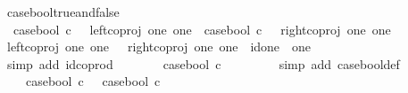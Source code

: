 \begin{isabellebody}
\endisatagproof
{\isafoldproof}%
%
\isadelimproof
\isanewline
%
\endisadelimproof
\isanewline
{}\isamarkupfalse%
\ case{\isacharunderscore}{\kern0pt}bool{\isacharunderscore}{\kern0pt}true{\isacharunderscore}{\kern0pt}and{\isacharunderscore}{\kern0pt}false{\isacharcolon}{\kern0pt}\isanewline
\ \ {\isachardoublequoteopen}{\isacharparenleft}{\kern0pt}case{\isacharunderscore}{\kern0pt}bool\ {\isasymcirc}\isactrlsub c\ {\isasymt}\ {\isacharequal}{\kern0pt}\ left{\isacharunderscore}{\kern0pt}coproj\ one\ one{\isacharparenright}{\kern0pt}\ {\isasymand}\ {\isacharparenleft}{\kern0pt}case{\isacharunderscore}{\kern0pt}bool\ {\isasymcirc}\isactrlsub c\ {\isasymf}\ {\isacharequal}{\kern0pt}\ right{\isacharunderscore}{\kern0pt}coproj\ one\ one{\isacharparenright}{\kern0pt}{\isachardoublequoteclose}\isanewline
%
\isadelimproof
%
\endisadelimproof
%
\isatagproof
{}\isamarkupfalse%
\ {\isacharminus}{\kern0pt}\isanewline
\ \ \isamarkupfalse%
\ {\isachardoublequoteopen}{\isacharparenleft}{\kern0pt}left{\isacharunderscore}{\kern0pt}coproj\ one\ one{\isacharparenright}{\kern0pt}\ {\isasymamalg}\ \ {\isacharparenleft}{\kern0pt}right{\isacharunderscore}{\kern0pt}coproj\ one\ one{\isacharparenright}{\kern0pt}\ {\isacharequal}{\kern0pt}\ id{\isacharparenleft}{\kern0pt}one\ {\isasymCoprod}\ one{\isacharparenright}{\kern0pt}{\isachardoublequoteclose}\isanewline
\ \ \ \ \isamarkupfalse%
\ {\isacharparenleft}{\kern0pt}simp\ add{\isacharcolon}{\kern0pt}\ id{\isacharunderscore}{\kern0pt}coprod{\isacharparenright}{\kern0pt}\isanewline
\ \ \isamarkupfalse%
\ \isamarkupfalse%
\ {\isachardoublequoteopen}{\isachardot}{\kern0pt}{\isachardot}{\kern0pt}{\isachardot}{\kern0pt}\ {\isacharequal}{\kern0pt}\ case{\isacharunderscore}{\kern0pt}bool\ {\isasymcirc}\isactrlsub c\ {\isacharparenleft}{\kern0pt}{\isasymt}\ {\isasymamalg}\ {\isasymf}{\isacharparenright}{\kern0pt}{\isachardoublequoteclose}\isanewline
\ \ \ \ \isamarkupfalse%
\ {\isacharparenleft}{\kern0pt}simp\ add{\isacharcolon}{\kern0pt}\ case{\isacharunderscore}{\kern0pt}bool{\isacharunderscore}{\kern0pt}def{}{\isacharparenright}{\kern0pt}\isanewline
\ \ \isamarkupfalse%
\ \isamarkupfalse%
\ {\isachardoublequoteopen}{\isachardot}{\kern0pt}{\isachardot}{\kern0pt}{\isachardot}{\kern0pt}\ \ {\isacharequal}{\kern0pt}\ {\isacharparenleft}{\kern0pt}case{\isacharunderscore}{\kern0pt}bool\ {\isasymcirc}\isactrlsub c\ {\isasymt}{\isacharparenright}{\kern0pt}\ {\isasymamalg}\ {\isacharparenleft}{\kern0pt}case{\isacharunderscore}{\kern0pt}bool\ {\isasymcirc}\isactrlsub c\ {\isasymf}{\isacharparenright}{\kern0pt}{\isachardoublequoteclose}\isanewline

\end{isabellebody}
